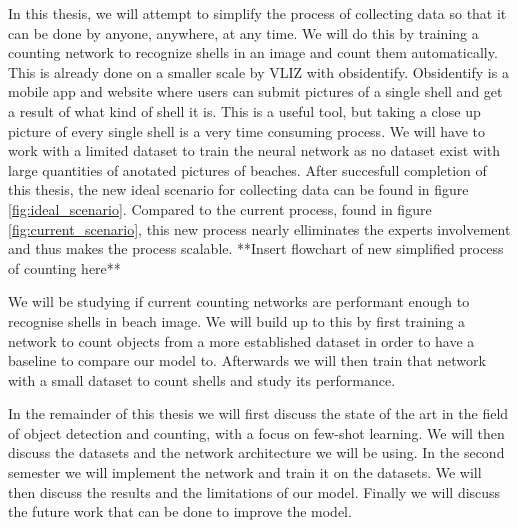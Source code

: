 In this thesis, we will attempt to simplify the process of collecting data so that it can be done by anyone, anywhere, at any time. We will do this by training a counting network to recognize shells in an image and count them automatically. This is already done on a smaller scale by VLIZ with obsidentify. Obsidentify is a mobile app and website where users can submit pictures of a single shell and get a result of what kind of shell it is. This is a useful tool, but taking a close up picture of every single shell is a very time consuming process. We will have to work with a limited dataset to train the neural network as no dataset exist with large quantities of anotated pictures of beaches. After succesfull completion of this thesis, the new ideal scenario for collecting data can be found in figure \ref{fig:ideal_scenario}. Compared to the current process, found in figure \ref{fig:current_scenario}, this new process nearly elliminates the experts involvement and thus makes the process scalable.
**Insert flowchart of new simplified process of counting here**

We will be studying if current counting networks are performant enough to recognise shells in beach image. We will build up to this by first training a network to count objects from a more established dataset in order to have a baseline to compare our model to. Afterwards we will then train that network with a small dataset to count shells and study its performance. 

In the remainder of this thesis we will first discuss the state of the art in the field of object detection and counting, with a focus on few-shot learning. We will then discuss the datasets and the network architecture we will be using. In the second semester we will implement the network and train it on the datasets. We will then discuss the results and the limitations of our model. Finally we will discuss the future work that can be done to improve the model.